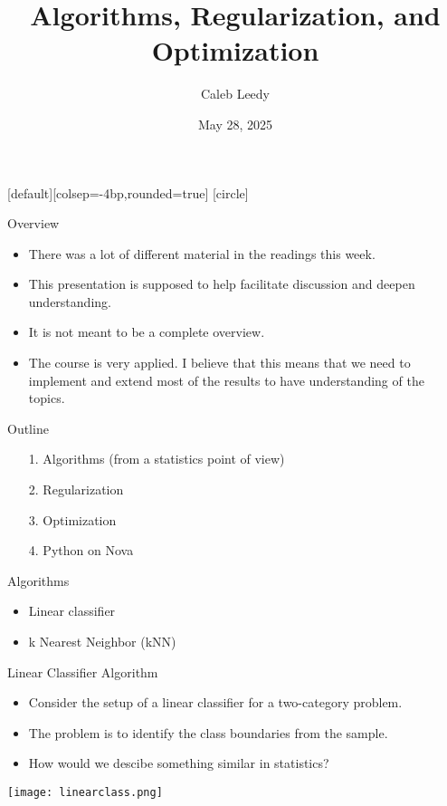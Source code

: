 \documentclass{beamer} %
\author{Caleb Leedy}
\title[AI NRI]{Algorithms, Regularization, and Optimization}
\date{May 28, 2025}
\begin{document}
\everymath{\displaystyle}
[default][colsep=-4bp,rounded=true]
[circle]
\frame{\titlepage}

\begin{frame}{Overview}

  \begin{itemize}
    \item There was a lot of different material in the readings this week.
    \item This presentation is supposed to help facilitate discussion and deepen understanding.
    \item It is not meant to be a complete overview.
    \item The course is very applied. I believe that this means that we need to
      implement and extend most of the results to have understanding of the
      topics.
  \end{itemize}

\end{frame}

\begin{frame}{Outline}
  \begin{itemize}
    \item[1.] Algorithms (from a statistics point of view)
    \item[2.] Regularization
    \item[3.] Optimization
    \item[4.] Python on Nova
  \end{itemize}
\end{frame}

\begin{frame}{Algorithms}
  \begin{itemize}
    \item Linear classifier
    \item k Nearest Neighbor (kNN)
  \end{itemize}
\end{frame}


\begin{frame}{Linear Classifier Algorithm}
  \begin{minipage}{0.65\textwidth}
  \begin{itemize}
    \item Consider the setup of a linear classifier for a two-category problem.
    \item The problem is to identify the class boundaries from the sample.
    \item How would we descibe something similar in statistics?
  \end{itemize}
\end{minipage}
\begin{minipage}{0.3\textwidth}
  \texttt{[image: linearclass.png]}
\end{minipage}
\end{frame}
\end{document}

